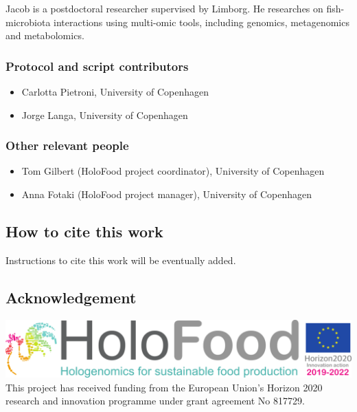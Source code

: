 \documentclass[
]{book}
\providecommand{\tightlist}{%
  \setlength{\itemsep}{0pt}\setlength{\parskip}{0pt}}
\begin{document}
Jacob is a postdoctoral researcher supervised by Limborg. He researches on fish-microbiota interactions using multi-omic tools, including genomics, metagenomics and metabolomics.

\hypertarget{protocol-and-script-contributors}{%
\subsubsection*{Protocol and script contributors}\label{protocol-and-script-contributors}}

\begin{itemize}
\tightlist
\item
  Carlotta Pietroni, University of Copenhagen
\item
  Jorge Langa, University of Copenhagen
\end{itemize}

\hypertarget{other-relevant-people}{%
\subsubsection*{Other relevant people}\label{other-relevant-people}}

\begin{itemize}
\tightlist
\item
  Tom Gilbert (HoloFood project coordinator), University of Copenhagen
\item
  Anna Fotaki (HoloFood project manager), University of Copenhagen
\end{itemize}

\hypertarget{how-to-cite-this-work}{%
\subsection*{How to cite this work}\label{how-to-cite-this-work}}

Instructions to cite this work will be eventually added.

\hypertarget{acknowledgement}{%
\subsection*{Acknowledgement}\label{acknowledgement}}

\includegraphics{images/holofood_logo_large.png}
This project has received funding from the European Union's Horizon 2020 research and innovation programme under grant agreement No 817729.
\end{document}
